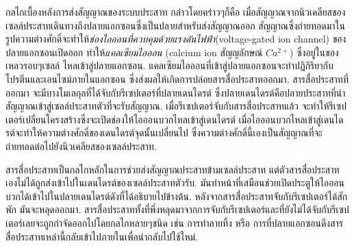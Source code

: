 {\begin{shaded}
กลไกเบื้องหลังการส่งสัญญาณของระบบประสาท
กล่าวโดยคร่าวๆก็คือ 
เมื่อสัญญาณจากนิวเคลียสของเซลล์ประสาทเดินทางถึงปลายแอกซอนซึ่งเป็นปลายสำหรับส่งสัญญาณออก
สัญญาณซึ่งถ่ายทอดมาในรูปความต่างศักดิ์จะทำให้\textit{ช่องไอออนที่ควบคุมด้วยแรงดันไฟฟ้า}(voltage-gated ion channel) ของปลายแอกซอนเปิดออก
ทำให้\textit{แคลเซียมไอออน} (calcium ion สัญญลักษณ์ $Ca^{2+}$) ซึ่งอยู่ในของเหลวรอบๆเซลล์ ไหลเข้าสู่ปลายแอกซอน.
แคลเซียมไอออนที่เข้าสู่ปลายแอกซอนจะทำปฏิกิริยากับโปรตีนและเอนไซม์ภายในแอกซอน
ซึ่งส่งผลให้เกิดการปล่อยสารสื่อประสาทออกมา.
สารสื่อประสาทที่ออกมา
จะมีบางโมเลกุลที่ได้จับกับรีเซปเตอร์ที่ปลายเดนไดรต์ ซึ่งปลายเดนไดรต์คือปลายประสาทที่นำสัญญาณเข้าสู่เซลล์ประสาทตัวที่จะรับสัญญาณ.
เมื่อรีเซปเตอร์จับกับสารสื่อประสาทแล้ว จะทำให้รีเซปเตอร์เปลี่ยนโครงสร้างซึ่งจะเปิดช่องให้ไอออนบวกไหลเข้าสู่เดนไดรต์ เมื่อไอออนบวกไหลเข้าสู่เดนไดรต์จะทำให้ความต่างศักดิ์ของเดนไดรต์จุดนั้นเปลี่ยนไป
ซึ่งความต่างศักดิ์นี้เองเป็นสัญญาณที่จะถ่ายทอดต่อไปยังนิวเคลียสของเซลล์ประสาท.

สารสื่อประสาทเป็นกลไกหลักในการช่วยส่งสัญญาณประสาทข้ามเซลล์ประสาท
แต่ตัวสารสื่อประสาทเองไม่ได้ถูกส่งเข้าไปในเดนไดรต์ของเซลล์ประสาทตัวรับ.
มันทำหน้าที่เสมือนช่วยเปิดประตูให้ไอออนบวกได้เข้าไปในปลายเดนไดรต์ดังที่ได้อธิบายไปข้างต้น.
หลังจากสารสื่อประสาทจับกับรีเซปเตอร์ได้สักพัก มันจะหลุดออกมา.
สารสื่อประสาททั้งที่พึ่งหลุดมาจากการจับกับรีเซปเตอร์และที่ยังไม่ได้จับกับรีเซปเตอร์เลยจะถูกกำจัดออกไปโดยกลไกหลายๆชนิด เช่น การทำลายทิ้ง หรือ การที่ปลายแอกซอนดึงสารสื่อประสาทเหล่านี้กลับเข้าไปภายในเพื่อนำกลับไปใช้ใหม่.


\end{shaded}}
